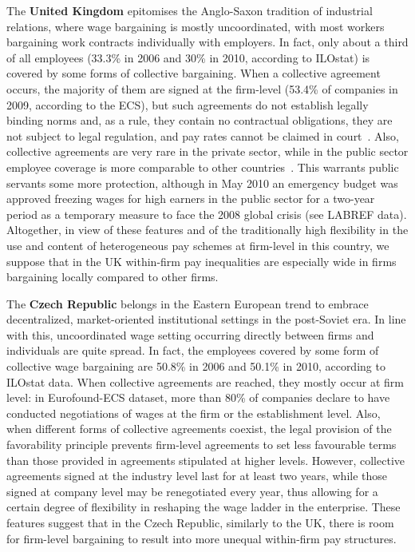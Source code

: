 \documentclass[12pt]{article}
\begin{document}
The \textbf{United Kingdom} epitomises the Anglo-Saxon tradition of industrial relations, where wage bargaining is mostly uncoordinated, with most workers bargaining work contracts individually with employers. In fact, only about a third of all employees (33.3\% in 2006 and 30\% in 2010, according to ILOstat) is covered by some forms of collective bargaining. When a collective agreement occurs, the majority of them are signed at the firm-level (53.4\% of companies in 2009, according to the ECS), but such agreements do not establish legally binding norms and, as a rule, they contain no contractual obligations, they are not subject to legal regulation, and pay rates cannot be claimed in court~\citep{visser2013wage}.
Also, collective agreements are very rare in the private sector, while in the public sector employee coverage is more comparable to other countries~\citep{fulton.2013}.
This warrants public servants some more protection, although in May 2010 an emergency budget was approved freezing wages for high earners in the public sector for a two-year period as a temporary measure to face the 2008 global crisis (see LABREF data). Altogether, in view of these features and of the traditionally high flexibility in the use and content of heterogeneous pay schemes at firm-level in this country, we suppose that in the UK within-firm pay inequalities are especially wide in firms bargaining locally compared to other firms.

The \textbf{Czech Republic} belongs in the Eastern European trend to embrace decentralized, market-oriented institutional settings in the post-Soviet era.
In line with this, uncoordinated wage setting occurring directly between firms and individuals are quite spread. In fact, the employees covered by some form of collective wage bargaining are 50.8\% in 2006 and 50.1\% in 2010, according to ILOstat data. When collective agreements are reached, they mostly occur at firm level: in Eurofound-ECS dataset, more than 80\% of companies declare to have conducted negotiations of wages at the firm or the establishment level. Also, when different forms of collective agreements coexist, the legal provision of the favorability principle prevents firm-level agreements to set less favourable terms than those provided in agreements stipulated at higher levels. However, collective agreements signed at the industry level last for at least two years, while those signed at company level may be renegotiated every year, thus allowing for a certain degree of flexibility in reshaping the wage ladder in the enterprise. These features suggest that in the Czech Republic, similarly to the UK, there is room for firm-level bargaining to result into more unequal within-firm pay structures.
\end{document}
